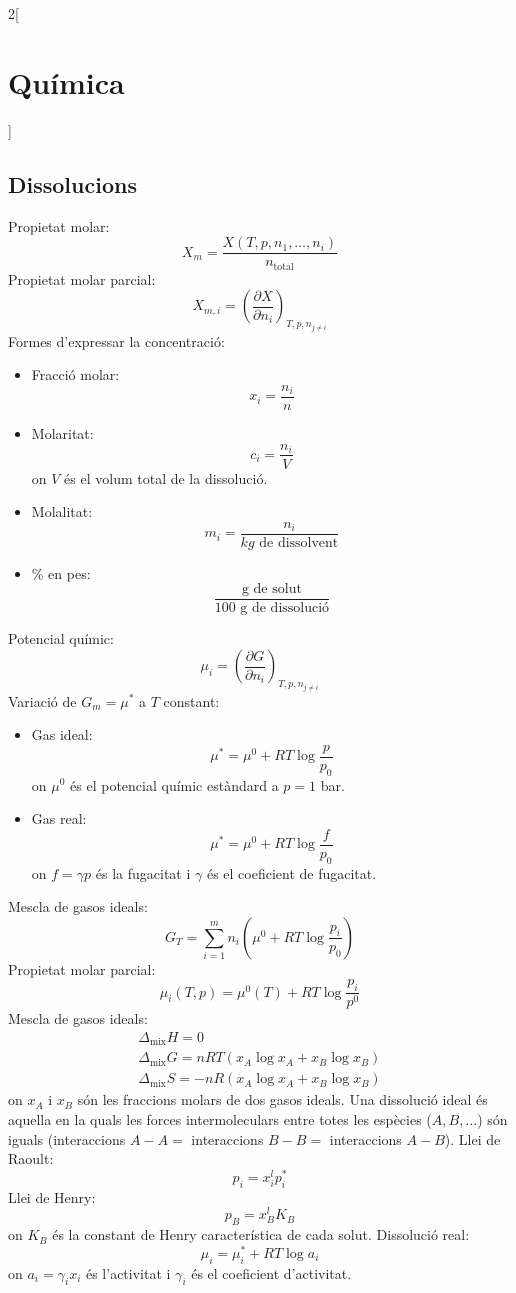 \documentclass[class=article,10pt,crop=false]{standalone}
\begin{document}
\begin{multicols}{2}[\section{Química}]
\subsection{Dissolucions}
Propietat molar: $$X_m=\frac{X(T,p,n_1,\ldots,n_i)}{n_\text{total}}$$
Propietat molar parcial: $$X_{m,i}=\left(\frac{\partial X}{\partial n_i}\right)_{T,p,n_{j\ne i}}$$
Formes d'expressar la concentració:
\begin{itemize}
    \item Fracció molar: $$x_i=\frac{n_i}{n}$$
    \item Molaritat: $$c_i=\frac{n_i}{V}$$ {\footnotesize on $V$ és el volum total de la dissolució.}
    \item Molalitat: $$m_i=\frac{n_i}{kg\text{ de dissolvent}}$$ 
    \item \% en pes: $$\frac{\text{g de solut}}{\text{100 g de dissolució}}$$
\end{itemize}
Potencial químic: $$\mu_i=\left(\frac{\partial G}{\partial n_i}\right)_{T,p,n_{j\ne i}}$$
Variació de $G_m=\mu^*$ a $T$ constant:
\begin{itemize}
    \item Gas ideal: $$\mu^*=\mu^0+RT\log\frac{p}{p_0}$$ {\footnotesize on $\mu^0$ és el potencial químic estàndard a $p=1$ bar.}
    \item Gas real: $$\mu^*=\mu^0+RT\log\frac{f}{p_0}$$ {\footnotesize on $f=\gamma p$ és la fugacitat i $\gamma$ és el coeficient de fugacitat.}
\end{itemize}
Mescla de gasos ideals: $$G_T=\sum_{i=1}^mn_i\left(\mu^0+RT\log\frac{p_i}{p_0}\right)$$
Propietat molar parcial: $$\mu_i(T,p)=\mu^0(T)+RT\log\frac{p_i}{p^0}$$
Mescla de gasos ideals: 
\begin{gather*}
    \Delta_\text{mix}H=0\\
    \Delta_\text{mix}G=nRT(x_A\log x_A+x_B\log x_B)\\
    \Delta_\text{mix}S=-nR(x_A\log x_A+x_B\log x_B)
\end{gather*} {\footnotesize on $x_A$ i $x_B$ són les fraccions molars de dos gasos ideals.}\newline
Una dissolució ideal és aquella en la quals les forces intermoleculars entre totes les espècies ($A, B,\ldots$) són iguals (interaccions $A-A=$ interaccions $B-B=$ interaccions $A-B$).\newline
Llei de Raoult: $$p_i=x_i^lp_i^*$$
Llei de Henry: $$p_B=x_B^lK_B$$ {\footnotesize on $K_B$ és la constant de Henry característica de cada solut.}\newline
Dissolució real: $$\mu_i=\mu_i^*+RT\log a_i$$ {\footnotesize on $a_i=\gamma_ix_i$ és l'activitat i $\gamma_i$ és el coeficient d'activitat.}

\end{multicols}
\end{document}
